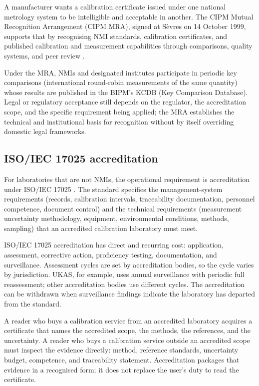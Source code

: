 A manufacturer wants a calibration certificate issued under one
national metrology system to be intelligible and acceptable in
another. The CIPM Mutual Recognition Arrangement (CIPM MRA),
signed at S\`evres on 14 October 1999, supports that by recognising
NMI standards, calibration certificates, and published calibration
and measurement capabilities through comparisons, quality systems,
and peer review \cite{std:bipm-cipm-mra}.

Under the MRA, NMIs and designated institutes participate in periodic
key comparisons (international round-robin measurements of the same
quantity) whose results are published in the BIPM's KCDB (Key
Comparison Database). Legal or regulatory acceptance still depends
on the regulator, the accreditation scope, and the specific
requirement being applied; the MRA establishes the technical and
institutional basis for recognition without by itself overriding
domestic legal frameworks.

\subsection{ISO/IEC 17025 accreditation}

For laboratories that are not NMIs, the operational requirement is
accreditation under ISO/IEC 17025 \cite{std:iso-iec-17025}. The
standard specifies the management-system requirements (records,
calibration intervals, traceability documentation, personnel
competence, document control) and the technical requirements
(measurement uncertainty methodology, equipment, environmental
conditions, methods, sampling) that an accredited calibration
laboratory must meet.

ISO/IEC 17025 accreditation has direct and recurring cost:
application, assessment, corrective action, proficiency testing,
documentation, and surveillance. Assessment cycles are set by
accreditation bodies, so the cycle varies by jurisdiction. UKAS, for
example, uses annual surveillance with periodic full reassessment;
other accreditation bodies use different cycles. The accreditation
can be withdrawn when surveillance findings indicate the laboratory
has departed from the standard.

A reader who buys a calibration service from an accredited laboratory
acquires a certificate that names the accredited scope, the methods,
the references, and the uncertainty. A reader who buys a calibration
service outside an accredited scope must inspect the evidence
directly: method, reference standards, uncertainty budget,
competence, and traceability statement. Accreditation packages that
evidence in a recognised form; it does not replace the user's duty
to read the certificate.

